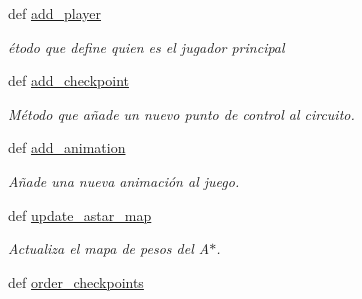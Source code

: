 \begin{DoxyCompactItemize}
def \hyperlink{classengine_1_1gamecontrol_1_1GameControl_a081c3e7f12eef5557c17cd8b9568906a}{add\-\_\-player}
\begin{DoxyCompactList}\small\item\em étodo que define quien es el jugador principal \end{DoxyCompactList}\item 
def \hyperlink{classengine_1_1gamecontrol_1_1GameControl_a152f9a80073c0c9bb845bc634750cb64}{add\-\_\-checkpoint}
\begin{DoxyCompactList}\small\item\em \-Método que añade un nuevo punto de control al circuito. \end{DoxyCompactList}\item 
def \hyperlink{classengine_1_1gamecontrol_1_1GameControl_aca070da852fec28cc99a2e2aca73974f}{add\-\_\-animation}
\begin{DoxyCompactList}\small\item\em \-Añade una nueva animación al juego. \end{DoxyCompactList}\item 
def \hyperlink{classengine_1_1gamecontrol_1_1GameControl_a22ef821012eaa77ce4968b2545488132}{update\-\_\-astar\-\_\-map}
\begin{DoxyCompactList}\small\item\em \-Actualiza el mapa de pesos del \-A$\ast$. \end{DoxyCompactList}\item 
\hypertarget{classengine_1_1gamecontrol_1_1GameControl_aad81d8bc068795cf73186e26b7d7884c}{
def \hyperlink{classengine_1_1gamecontrol_1_1GameControl_aad81d8bc068795cf73186e26b7d7884c}{order\-\_\-checkpoints}}
\label{classengine_1_1gamecontrol_1_1GameControl_aad81d8bc068795cf73186e26b7d7884c}


\end{DoxyCompactItemize}
